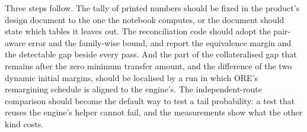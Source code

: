 Three steps follow. The tally of printed numbers should be fixed in the product's design document to the one the notebook computes, or the document should state which tables it leaves out. The reconciliation code should adopt the pair-aware error and the family-wise bound, and report the equivalence margin and the detectable gap beside every pass. And the part of the collateralised gap that remains after the zero minimum transfer amount, and the difference of the two dynamic initial margins, should be localised by a run in which ORE's remargining schedule is aligned to the engine's. The independent-route comparison should become the default way to test a tail probability: a test that reuses the engine's helper cannot fail, and the measurements show what the other kind costs.
